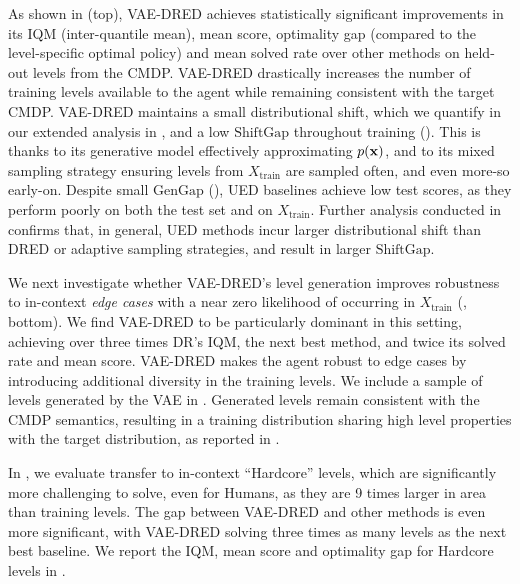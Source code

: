 \documentclass{article}
\theoremstyle{plain}
\theoremstyle{definition}
\theoremstyle{remark}
\begin{document}
As shown in  (top), VAE-DRED achieves statistically significant improvements in its IQM (inter-quantile mean), mean score, optimality gap (compared to the level-specific optimal policy) and mean solved rate over other methods on held-out levels from the CMDP. VAE-DRED drastically increases the number of training levels available to the agent while remaining consistent with the target CMDP. VAE-DRED maintains a small distributional shift, which we quantify in our extended analysis in , and a low $\text{ShiftGap}$ throughout training (). This is thanks to its generative model effectively approximating $p({\mathbf{x}})$, and to its mixed sampling strategy ensuring levels from $X_\text{train}$ are sampled often, and even more-so early-on. Despite small $\text{GenGap}$ (), UED baselines achieve low test scores, as they perform poorly on both the test set and on $X_\text{train}$.  Further analysis conducted in  confirms that, in general, UED methods incur larger distributional shift than DRED or adaptive sampling strategies, and result in larger $\text{ShiftGap}$.

We next investigate whether VAE-DRED's level generation improves robustness to in-context \textit{edge cases} with a near zero likelihood of occurring in $X_\text{train}$ (, bottom). We find VAE-DRED to be particularly dominant in this setting, achieving over three times DR's IQM, the next best method, and twice its solved rate and mean score. VAE-DRED makes the agent robust to edge cases by introducing additional diversity in the training levels. We include a sample of levels generated by the VAE in . Generated levels remain consistent with the CMDP semantics, resulting in a training distribution sharing high level properties with the target distribution, as reported in . 

In , we evaluate transfer to in-context ``Hardcore'' levels, which are significantly more challenging to solve, even for Humans, as they are 9 times larger in area than training levels. The gap between VAE-DRED and other methods is even more significant, with VAE-DRED solving three times as many levels as the next best baseline. We report the IQM, mean score and optimality gap for Hardcore levels in .
\end{document}
